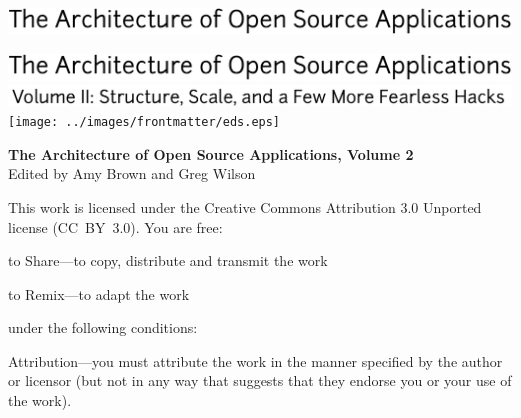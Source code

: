 \newpage

\thispagestyle{empty}
\vspace*{8.5cm}
\hspace{-2.3cm}
\includegraphics[width=475pt]{../images/frontmatter/title.pdf}

\newpage

\thispagestyle{empty}
\mbox{}    %

\newpage

\thispagestyle{empty}
\vspace*{8.5cm}
\hspace{-2.3cm}
\includegraphics[width=475pt]{../images/frontmatter/title.pdf}
\\
\vspace{-1.1cm}
\hspace{-2.0cm}
\includegraphics[width=400pt]{../images/frontmatter/subtitle.pdf}
\vfill
\hspace{5.5cm}
\texttt{[image: ../images/frontmatter/eds.eps]}

\newpage

\thispagestyle{empty}

\small
\noindent \textbf{The Architecture of Open Source Applications, Volume 2} \\
Edited by Amy Brown and Greg Wilson

\vspace{0.15cm}

\noindent
This work is licensed under the Creative Commons Attribution 3.0
Unported license (CC~BY~3.0).  You are free:

\begin{aosaitemize}
  \item to Share---to copy, distribute and transmit the work
  \item to Remix---to adapt the work
\end{aosaitemize}

\noindent
under the following conditions:

\begin{aosaitemize}
  \item Attribution---you must attribute the work in the manner
    specified by the author or licensor (but not in any way that
    suggests that they endorse you or your use of the work).
\end{aosaitemize}

